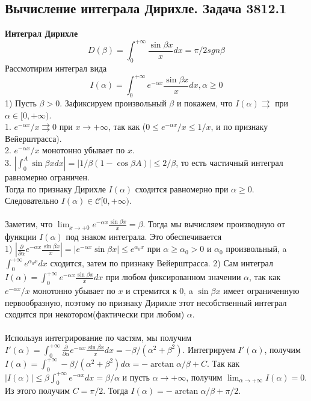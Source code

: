\documentclass{article}
\begin{document}
\subsection{Вычисление интеграла Дирихле. Задача 3812.1}
	\textbf{Интеграл Дирихле}\\
	\begin{equation}
	\label{6.1}
	D(\beta)=\int_{0}^{+\infty} \frac{\sin\beta x}{x}dx=\pi/2sgn\beta
	\end{equation}
	Рассмотирим интеграл вида
	\begin{equation}
	\label{6.2}
	I(\alpha)=\int_{0}^{+\infty} {e}^{-\alpha x}\frac{\sin\beta x}{x}dx, \alpha \ge 0
	\end{equation}
	1) Пусть $\beta>0$. Зафиксируем произвольный $\beta$ и покажем, что $I(\alpha)\rightrightarrows$ при $\alpha \in [0,+\infty)$.\\
	1. ${e}^{-\alpha x}/x \rightrightarrows 0$ при $x\rightarrow +\infty$, так как ($0\le {e}^{-\alpha x}/x\le 1/x$, и по признаку Вейерштрасса).\\
	2. ${e}^{-\alpha x}/x$ монотонно убывает по $x$.\\ 
	3. $|\int_{0}^{A} \sin\beta xdx|=|1/\beta(1-\cos \beta A)|\le 2/\beta$, то есть частичный интеграл равномерно ограничен.\\
	Тогда по признаку Дирихле $I(\alpha)$ сходится равномерно при $\alpha\ge 0$.\\
	Следовательно $I(\alpha) \in \mathcal{C}[0,+\infty)$. \\
	\\
	Заметим, что $\lim_{x\rightarrow +0} {e}^{-\alpha x} \frac{\sin \beta x}{x}=\beta$. Тогда мы вычисляем производную от функции $I(\alpha)$ под знаком интеграла. Это обеспечивается\\ 
	1) $|\frac{\partial}{\partial{\alpha}} {e}^{-\alpha x}\frac{\sin \beta x}{x}|=|{e}^{-\alpha x}\sin \beta x|\le {e}^{{\alpha}_{0}x}$ при $\alpha\ge {\alpha}_{0}>0$ и ${\alpha}_{0}$ произвольный, a $\int_{0}^{+\infty} {e}^{{\alpha}_{0}x}dx$ сходится, затем по признаку Вейерштрасса.
	2) Сам интеграл $I(\alpha)=\int_{0}^{+\infty} {e}^{-\alpha x}\frac{\sin\beta x}{x}dx$ при любом фиксированном значении $\alpha$, так как ${e}^{-\alpha x}/x$ монотонно убывает по $x$ и стремится к $0$, a $\sin\beta x$ имеет ограниченную первообразную, поэтому по признаку Дирихле этот несобственный интеграл сходится при некотором(фактически при любом) $\alpha$.
	\\
	\\
	Используя интегрирование по частям, мы получим $I'(\alpha)=\int_{0}^{+\infty} \frac{\partial}{\partial{\alpha}} {e}^{-\alpha x}\frac{\sin \beta x}{x}dx=-\beta/({\alpha}^{2}+{\beta}^{2})$. Интегрируем $I'(\alpha)$, получим $I(\alpha)=\int_{0}^{+\infty} -\beta/({\alpha}^{2}+{\beta}^{2})d\alpha=-\arctan\alpha/\beta+C$. Так как $|I(\alpha)|\le \beta\int_{0}^{+\infty} {e}^{-\alpha x}dx=\beta/\alpha$ и пусть $\alpha\rightarrow +\infty$, получим $\lim_{\alpha \rightarrow+\infty} I(\alpha)=0$. Из этого получим $C=\pi/2$. Тогда $I(\alpha)=-\arctan\alpha/\beta+\pi/2.$\\
\end{document}
